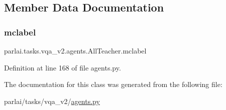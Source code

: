 \subsection{Member Data Documentation}
\mbox{\label{classparlai_1_1tasks_1_1vqa__v2_1_1agents_1_1AllTeacher_a4da023a0162581d4364ccaafafb001d6}} 
\subsubsection{\texorpdfstring{mclabel}{mclabel}}
{\footnotesize\ttfamily parlai.\+tasks.\+vqa\+\_\+v2.\+agents.\+All\+Teacher.\+mclabel}



Definition at line 168 of file agents.\+py.



The documentation for this class was generated from the following file\+:\begin{DoxyCompactItemize}
\item 
parlai/tasks/vqa\+\_\+v2/\hyperlink{parlai_2tasks_2vqa__v2_2agents_8py}{agents.\+py}\end{DoxyCompactItemize}
